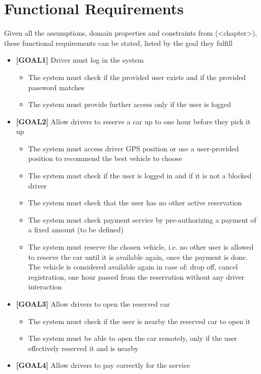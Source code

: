 \section{Functional Requirements}

Given all the assumptions, domain properties and constraints from (<chapter>), these functional requirements can be stated, listed by the goal they fulfill

\begin{itemize}
\item \textbf{[GOAL1]} Driver must log in the system 
	\begin{itemize}
	\item The system must check if the provided user exists and if the provided password matches
	\item The system must provide further access only if the user is logged
	\end{itemize}
\item \textbf{[GOAL2]} Allow drivers to reserve a car up to one hour before they pick it up
	\begin{itemize}
	\item The system must access driver GPS position or use a user-provided position to recommend the best vehicle to choose
	\item The system must check if the user is logged in and if it is not a blocked driver
	\item The system must check that the user has no other active reservation 
	\item The system must check payment service by pre-authorizing a payment of a fixed amount (to be defined)
	\item The system must reserve the chosen vehicle, i.e. no other user is allowed to reserve the car until it is available again, once the payment is done. The vehicle is considered available again in case of: drop off, cancel registration, one hour passed from the reservation without any driver interaction
	\end{itemize}
\item \textbf{[GOAL3]} Allow drivers to open the reserved car
	\begin{itemize}
	\item The system must check if the user is nearby the reserved car to open it
	\item The system must be able to open the car remotely, only if the user effectively reserved it and is nearby
	\end{itemize}
\item \textbf{[GOAL4]} Allow drivers to pay correctly for the service

\end{itemize}
